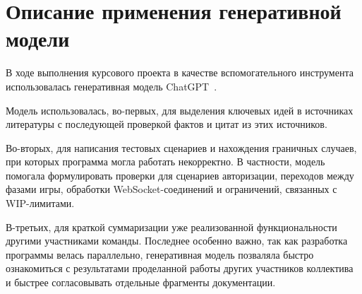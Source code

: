 \section{Описание применения генеративной модели}

В ходе выполнения курсового проекта в качестве вспомогательного инструмента использовалась генеративная модель ChatGPT~\cite{GPT}. 

Модель использовалась, во-первых, для выделения ключевых идей в источниках литературы с последующей проверкой фактов и цитат из этих источников. 

Во-вторых, для написания тестовых сценариев и нахождения граничных случаев, при которых программа могла работать некорректно. В частности, модель помогала формулировать проверки для сценариев авторизации, переходов между фазами игры, обработки WebSocket-соединений и ограничений, связанных с WIP-лимитами. 

В-третьих, для краткой суммаризации уже реализованной функциональности другими участниками команды. Последнее особенно важно, так как разработка программы велась параллельно, генеративная модель позваляла быстро ознакомиться с результатами проделанной работы других участников коллектива и быстрее согласовывать отдельные фрагменты документации.












